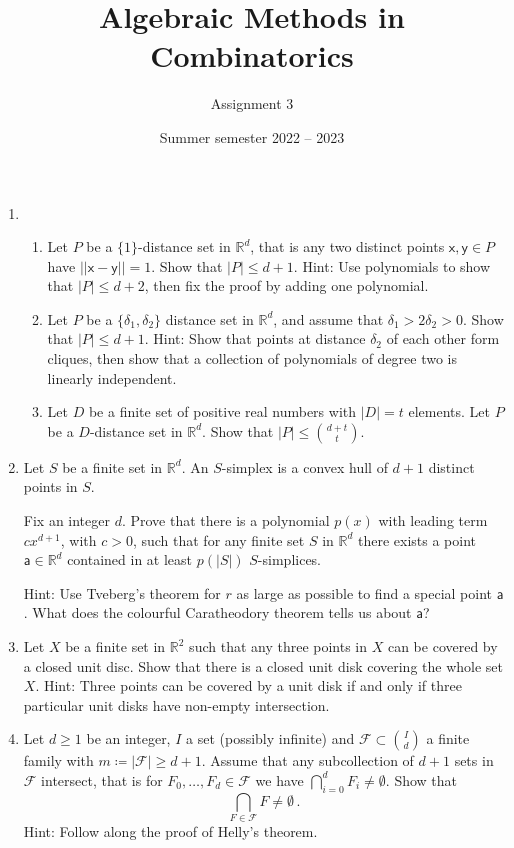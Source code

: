 \documentclass[kulak]{tplt}
\title{Algebraic Methods in Combinatorics}
\author{Assignment 3}
\date{Summer semester 2022 -- 2023}
\theoremstyle{definition}
\newcommand{\R}{\mathbb{R}}
\newcommand{\FF}{\mathcal F}
\newcommand{\vx}{\mathsf{x}}
\newcommand{\vy}{\mathsf{y}}
\newcommand{\va}{\mathsf{a}}
\begin{document}
\maketitle
\begin{enumerate}
\item 

\begin{enumerate}
\item  Let $P$ be a $\{1\}$-distance set in $\R^d$, that is any two distinct points $\vx, \vy \in P $ have $||\vx - \vy || = 1$.
Show that $|P| \leq d+1$.
Hint: Use polynomials to show that $|P|\leq d+2$, then fix the proof by adding one polynomial.

\item Let $P$ be a $\{\delta_1, \delta_2\}$ distance set in $\R^d $, and assume that $\delta_1> 2 \delta_2 > 0$.
Show that $|P| \leq d+1$.
Hint: Show that points at distance $\delta_2$ of each other form cliques, then show that a collection of polynomials of degree two is linearly independent.


\item
Let $D $ be a finite set of positive real numbers with $|D| = t$ elements.
Let $P$ be a $D$-distance set in $\R^d$.
Show that $|P| \leq \binom{d+t}{t}$.

\end{enumerate}

\item Let $S$ be a finite set in $\R^d$.
An $S$-simplex is a convex hull of $d+1$ distinct points in $S$.

Fix an integer $d$.
Prove that there is a polynomial $p(x)$ with leading term $c x^{d+1}$, with $c > 0$, such that for any finite set $S$ in $\R^d$ there exists a point $\va \in \R^d$ contained in at least $p(|S|)$ $S$-simplices.

Hint: Use Tveberg's theorem for $r$ as large as possible to find a special point $\va$.
What does the colourful Caratheodory theorem tells us about $\va$?


\item Let $X$ be a finite set in $\R^2$ such that any three points in $X$ can be covered by a closed unit disc.
Show that there is a closed unit disk covering the whole set $X$.
Hint: Three points can be covered by a unit disk if and only if three particular unit disks have non-empty intersection.


\item 
Let $d\geq 1$ be an integer, $I$ a set (possibly infinite) and $\mathcal F \subset \binom{I}{d}$ a finite family with $m\coloneqq |\FF | \geq d+1$.
Assume that any subcollection of $d+1$ sets in $\FF $ intersect, that is for $F_0, \ldots, F_d \in \FF $ we have $\bigcap_{i=0}^d F_i \neq \emptyset$.
Show that 
$$ \bigcap_{F \in \FF} F \neq \emptyset \, . $$
Hint: 
Follow along the proof of Helly's theorem.


\end{enumerate}
\end{document}

